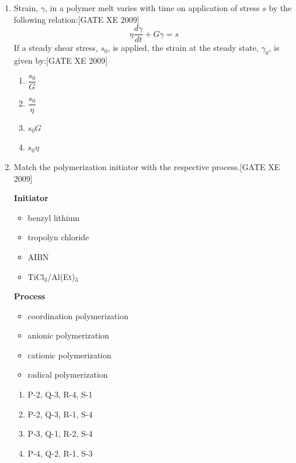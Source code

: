 \documentclass[journal,12pt,onecolumn]{IEEEtran}
\theoremstyle{remark}
\begin{document}
\begin{enumerate}
\begin{enumerate}
\begin{enumerate}[label=\textbf{Q.\arabic*.},  wide=0pt, leftmargin=*]
\item Strain, $\gamma$, in a polymer melt varies with time on application of stress $s$ by the following relation:\hfill[GATE XE 2009]
\[
\eta \frac{d\gamma}{dt} + G\gamma = s
\]
If a steady shear stress, $s_0$, is applied, the strain at the steady state, $\gamma_0$, is given by:\hfill[GATE XE 2009]

\begin{multicols}{2}
\begin{enumerate}
\item $\dfrac{s_0}{G}$
\item $\dfrac{s_0}{\eta}$
\item $s_0 G$
\item $s_0 \eta$
\end{enumerate}
\end{multicols}

\item Match the polymerization initiator with the respective process.\hfill[GATE XE 2009]\\[0.5em]
\begin{minipage}{0.45\textwidth}
\textbf{Initiator}
\begin{itemize}
  \item[P.] benzyl lithium
  \item[Q.] tropolyn chloride
  \item[R.] AIBN
  \item[S.] TiCl$_3$/Al(Et)$_3$
\end{itemize}
\end{minipage}
\hfill
\begin{minipage}{0.45\textwidth}
\textbf{Process}
\begin{itemize}
  \item[1.] coordination polymerization
  \item[2.] anionic polymerization
  \item[3.] cationic polymerization
  \item[4.] radical polymerization
\end{itemize}
\end{minipage}

\vspace{0.5em}
\begin{multicols}{2}
\begin{enumerate}
\item P-2, Q-3, R-4, S-1
\item P-2, Q-3, R-1, S-4
\item P-3, Q-1, R-2, S-4
\item P-4, Q-2, R-1, S-3
\end{enumerate}
\end{multicols}


\end{enumerate}
\end{enumerate}
\end{enumerate}
\end{document}
